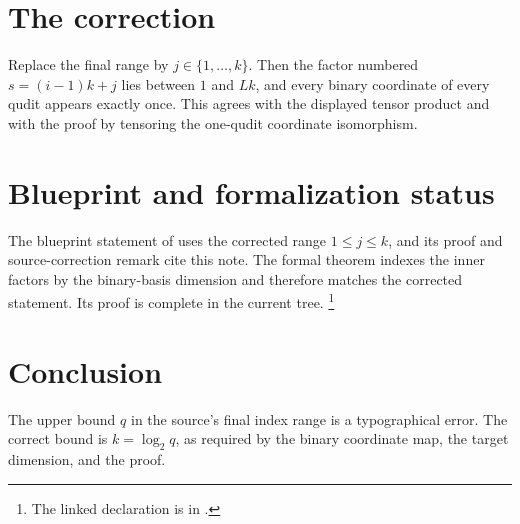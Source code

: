 \documentclass[11pt]{article}
\begin{document}
\section{The correction}

Replace the final range by $j\in\{1,\ldots,k\}$.  Then the factor numbered
$s=(i-1)k+j$ lies between $1$ and $Lk$, and every binary coordinate of every
qudit appears exactly once.  This agrees with the displayed tensor product and
with the proof by tensoring the one-qudit coordinate isomorphism.

\section{Blueprint and formalization status}

The blueprint statement of  uses the corrected range
$1\leq j\leq k$, and its proof and source-correction remark cite this note.
The formal theorem indexes the inner factors by the binary-basis dimension and
therefore matches the corrected statement.  Its proof is complete in the
current tree.%
\footnote{The linked declaration is  in
.}

\section{Conclusion}

The upper bound $q$ in the source's final index range is a typographical error.
The correct bound is $k=\log_2 q$, as required by the binary coordinate map,
the target dimension, and the proof.



\end{document}
